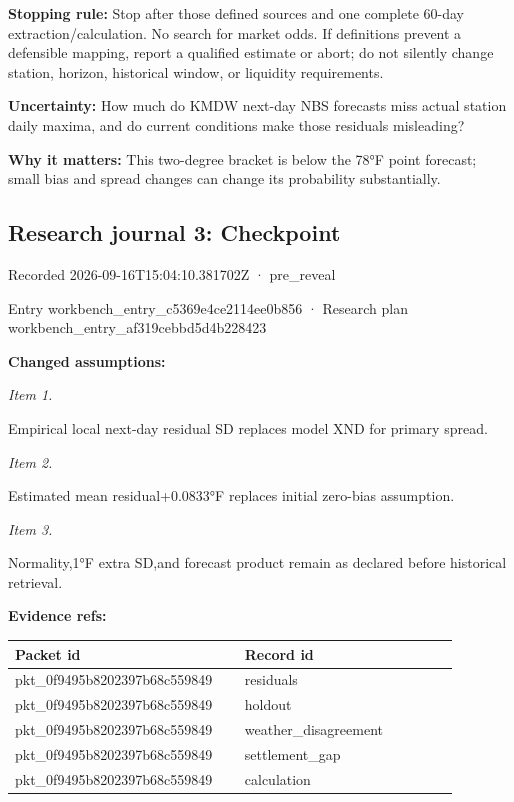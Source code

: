 \documentclass[11pt]{article}
\begin{document}
\par\noindent\textbf{Stopping rule:} Stop after those defined sources and one complete 60-day extraction/calculation. No search for market odds. If definitions prevent a defensible mapping, report a qualified estimate or abort; do not silently change station, horizon, historical window, or liquidity requirements.

\par\noindent\textbf{Uncertainty:} How much do KMDW next-day NBS forecasts miss actual station daily maxima, and do current conditions make those residuals misleading?

\par\noindent\textbf{Why it matters:} This two-degree bracket is below the 78°F point forecast; small bias and spread changes can change its probability substantially.

\subsection*{\textcolor{epdarkgreen}{Research journal 3: Checkpoint}}
Recorded 2026-09-16T15:04:10.381702Z · pre\_reveal


Entry workbench\_en\hspace{0pt}try\_c5369e4c\hspace{0pt}e2114ee0b856 · Research plan workbench\_en\hspace{0pt}try\_af319ceb\hspace{0pt}bd5d4b228423


\par\noindent\textbf{Changed assumptions:} \par \par\noindent\textit{Item 1.}\par Empirical local next-day residual SD replaces model XND for primary spread.

\par\noindent\textit{Item 2.}\par Estimated mean residual+0.0833°F replaces initial zero-bias assumption.

\par\noindent\textit{Item 3.}\par Normality,1°F extra SD,and forecast product remain as declared before historical retrieval.

\par\noindent\textbf{Evidence refs:} \par \begin{longtable}{>{\raggedright\arraybackslash}p{0.440\linewidth}>{\raggedright\arraybackslash}p{0.440\linewidth}}
Packet id & Record id \\ \hline\endhead
pkt\_0f9495b8202397b68c559849 & residuals \\
pkt\_0f9495b8202397b68c559849 & holdout \\
pkt\_0f9495b8202397b68c559849 & weather\_disagreement \\
pkt\_0f9495b8202397b68c559849 & settlement\_gap \\
pkt\_0f9495b8202397b68c559849 & calculation \\
\end{longtable}
\end{document}
